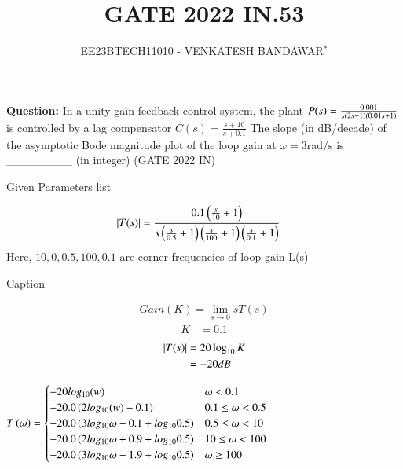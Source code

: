 \documentclass[journal,12pt,twocolumn]{IEEEtran}
\theoremstyle{remark}
\begin{document}

\vspace{3cm}

\title{GATE 2022 IN.53}
\author{EE23BTECH11010 - VENKATESH BANDAWAR$^{*}$%
}
\maketitle
\newpage
\bigskip
\textbf{Question:} In a unity-gain feedback control system, the plant
$P(s) = \frac{0.001}{s\left(2s+1\right)\left(0.01s+1\right)}$
is controlled by a lag compensator
$C(s) = \frac{s+10}{s+0.1}$
The slope (in dB/decade) of the asymptotic Bode magnitude plot of the loop gain
at $\omega= 3 $rad/s is \_\_\_\_\_\_\_\_ (in integer)
\hfill(GATE 2022 IN)\\
\solution
\begin{table}[!h]
    \centering
    
    \caption{Given Parameters list}
    \label{tab:Given Parameters list.gate2022.IN.53}
\end{table}
\begin{align}
    \left\vert T(s)\right\vert &= \frac{0.1\left(\frac{s}{10}+1\right)}{s\left(\frac{s}{0.5}+1\right)\left(\frac{s}{100}+1\right)\left(\frac{s}{0.1}+1\right)}\label{eqn of loop gain.gate2022.IN.53}
\end{align}
Here, $10,0,0.5,100,0.1$ are corner frequencies of loop gain L(s) 

\begin{table}[!h]
    \centering
    
    \caption{Caption}
    \label{tab:corner frequency.gate2022.IN.53}
\end{table}

\begin{align}
    Gain(K) = \lim_{s\rightarrow 0} sT(s)
\end{align}
\begin{align}
    K &= 0.1
\end{align}
\begin{align}
    \left\vert T(s)\right\vert &= 20\log_{10} K\\
    &= -20 dB
\end{align}

$T\left(\omega\right) = \begin{cases} 
    -20 log_{10}(w) &  \omega < 0.1 \\
    -20.0 \left(2log_{10}(w) - 0.1\right)  &  0.1 \leq \omega < 0.5 \\
    -20.0 \left(3log_{10}{\omega} - 0.1 + log_{10}{0.5}\right)  &  0.5 \leq \omega < 10 \\
    -20.0 \left(2log_{10}{\omega} + 0.9 + log_{10}{0.5}\right)  &  10 \leq \omega < 100 \\
    -20.0 \left(3log_{10}{\omega} - 1.9 + log_{10}{0.5}\right)  &  \omega \geq 100 \\
\end{cases}$
\end{document}
